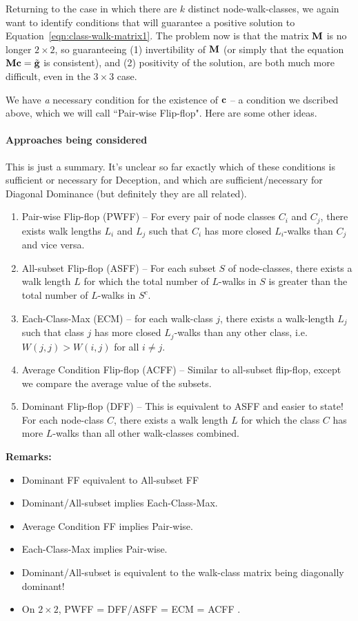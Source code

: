 

Returning to the case in which there are $k$ distinct node-walk-classes, we again want to identify conditions that will guarantee a positive solution to Equation~\eqref{eqn:class-walk-matrix1}.
The problem now is that the matrix $\textbf{M}$ is no longer $2\times 2$, so guaranteeing (1) invertibility of $\textbf{M}$ (or simply that the equation $\textbf{M}\textbf{c} = \tilde{\textbf{g}}$ is consistent), and (2) positivity of the solution, are both much more difficult, even in the $3\times 3$ case.

We have \emph{a} necessary condition for the existence of $\textbf{c}$ -- a condition we dscribed above, which we will call ``Pair-wise Flip-flop". Here are some other ideas.

\paragraph{Approaches being considered}
This is just a summary. It's unclear so far exactly which of these conditions is sufficient or necessary for Deception, and which are sufficient/necessary for Diagonal Dominance (but definitely they are all related).
\begin{enumerate}
  \item Pair-wise Flip-flop (PWFF) -- For every pair of node classes $C_i$ and $C_j$, there exists walk lengths $L_i$ and $L_j$ such that $C_i$ has more closed $L_i$-walks than $C_j$ and vice versa.
  \item All-subset Flip-flop (ASFF) -- For each subset $S$ of node-classes, there exists a walk length $L$ for which the total number of $L$-walks in $S$ is greater than the total number of $L$-walks in $S^c$.
  \item Each-Class-Max (ECM) -- for each walk-class $j$, there exists a walk-length $L_j$ such that class $j$ has more closed $L_j$-walks than any other class, i.e. $W(j,j) > W(i,j)$ for all $i\neq j$.
  \item Average Condition Flip-flop (ACFF) -- Similar to all-subset flip-flop, except we compare the average value of the subsets.
  \item Dominant Flip-flop (DFF) -- This is equivalent to ASFF and easier to state! For each node-class $C$, there exists a walk length $L$ for which the class $C$ has more $L$-walks than all other walk-classes combined.
\end{enumerate}

\textbf{Remarks:}
\begin{itemize}
  \item Dominant FF equivalent to All-subset FF
  \item Dominant/All-subset implies Each-Class-Max.
  \item Average Condition FF implies Pair-wise.
  \item Each-Class-Max implies Pair-wise.
  \item Dominant/All-subset is equivalent to the walk-class matrix being diagonally dominant!
  \item On $2\times2$, PWFF = DFF/ASFF = ECM = ACFF .
\end{itemize}


